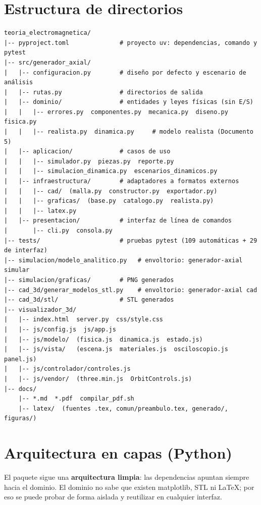 \documentclass[11pt]{article}
\begin{document}
\section{Estructura de directorios}
\begin{lstlisting}[style=consola]
teoria_electromagnetica/
|-- pyproject.toml              # proyecto uv: dependencias, comando y pytest
|-- src/generador_axial/
|   |-- configuracion.py        # diseño por defecto y escenario de análisis
|   |-- rutas.py                # directorios de salida
|   |-- dominio/                # entidades y leyes físicas (sin E/S)
|   |   |-- errores.py  componentes.py  mecanica.py  diseno.py  fisica.py
|   |   |-- realista.py  dinamica.py     # modelo realista (Documento 5)
|   |-- aplicacion/             # casos de uso
|   |   |-- simulador.py  piezas.py  reporte.py
|   |   |-- simulacion_dinamica.py  escenarios_dinamicos.py
|   |-- infraestructura/        # adaptadores a formatos externos
|   |   |-- cad/  (malla.py  constructor.py  exportador.py)
|   |   |-- graficas/  (base.py  catalogo.py  realista.py)
|   |   |-- latex.py
|   |-- presentacion/           # interfaz de línea de comandos
|       |-- cli.py  consola.py
|-- tests/                      # pruebas pytest (109 automáticas + 29 de interfaz)
|-- simulacion/modelo_analitico.py   # envoltorio: generador-axial simular
|-- simulacion/graficas/        # PNG generados
|-- cad_3d/generar_modelos_stl.py    # envoltorio: generador-axial cad
|-- cad_3d/stl/                 # STL generados
|-- visualizador_3d/
|   |-- index.html  server.py  css/style.css
|   |-- js/config.js  js/app.js
|   |-- js/modelo/  (fisica.js  dinamica.js  estado.js)
|   |-- js/vista/   (escena.js  materiales.js  osciloscopio.js  panel.js)
|   |-- js/controlador/controles.js
|   |-- js/vendor/  (three.min.js  OrbitControls.js)
|-- docs/
    |-- *.md  *.pdf  compilar_pdf.sh
    |-- latex/  (fuentes .tex, comun/preambulo.tex, generado/, figuras/)
\end{lstlisting}

\section{Arquitectura en capas (Python)}
El paquete  sigue una \textbf{arquitectura limpia}: las dependencias apuntan siempre
hacia el dominio. El dominio no sabe que existen matplotlib, STL ni \LaTeX; por eso se puede probar de forma
aislada y reutilizar en cualquier interfaz.
\end{document}

